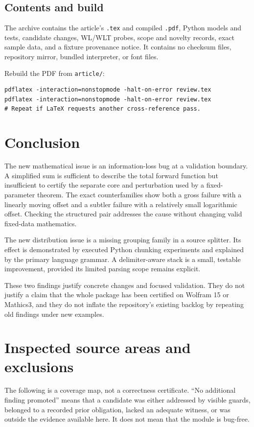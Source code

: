 \documentclass[11pt,letterpaper]{article}
\newcommand{\code}[1]{\nolinkurl{#1}}
\begin{document}
\subsection{Contents and build}
The archive contains the article's \code{.tex} and compiled \code{.pdf}, Python models and tests, candidate changes, WL/WLT probes, scope and novelty records, exact sample data, and a fixture provenance notice. It contains no checksum files, repository mirror, bundled interpreter, or font files.

Rebuild the PDF from \code{article/}:
\begin{lstlisting}
pdflatex -interaction=nonstopmode -halt-on-error review.tex
pdflatex -interaction=nonstopmode -halt-on-error review.tex
# Repeat if LaTeX requests another cross-reference pass.
\end{lstlisting}

\section{Conclusion}
The new mathematical issue is an information-loss bug at a validation boundary. A simplified sum is sufficient to describe the total forward function but insufficient to certify the separate core and perturbation used by a fixed-parameter theorem. The exact counterfamilies show both a gross failure with a linearly moving offset and a subtler failure with a relatively small logarithmic offset. Checking the structured pair addresses the cause without changing valid fixed-data mathematics.

The new distribution issue is a missing grouping family in a source splitter. Its effect is demonstrated by executed Python chunking experiments and explained by the primary language grammar. A delimiter-aware stack is a small, testable improvement, provided its limited parsing scope remains explicit.

These two findings justify concrete changes and focused validation. They do not justify a claim that the whole package has been certified on Wolfram 15 or Mathics3, and they do not inflate the repository's existing backlog by repeating old findings under new examples.

\appendix
\section{Inspected source areas and exclusions}
\label{app:coverage}
The following is a coverage map, not a correctness certificate. ``No additional finding promoted'' means that a candidate was either addressed by visible guards, belonged to a recorded prior obligation, lacked an adequate witness, or was outside the evidence available here. It does not mean that the module is bug-free.
\end{document}
